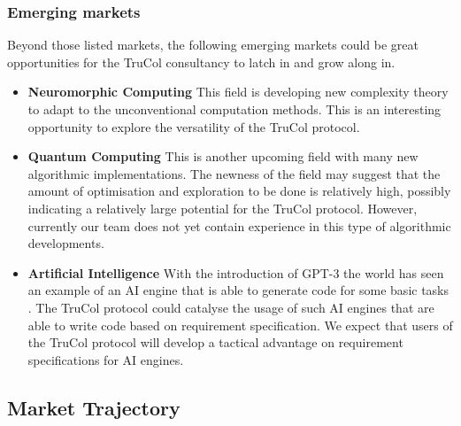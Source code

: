 \subsubsection{Emerging markets}\label{subsubsec:emerging_markets}
Beyond those listed markets, the following emerging markets could be great opportunities for the TruCol consultancy to latch in and grow along in.
\begin{itemize}
	\item \textbf{Neuromorphic Computing} This field is developing new complexity theory to adapt to the unconventional computation methods. This is an interesting opportunity to explore the versatility of the TruCol protocol.
	\item \textbf{Quantum Computing} This is another upcoming field with many new algorithmic implementations. The newness of the field may suggest that the amount of optimisation and exploration to be done is relatively high, possibly indicating a relatively large potential for the TruCol protocol. However, currently our team does not yet contain experience in this type of algorithmic developments.
	\item \textbf{Artificial Intelligence} With the introduction of GPT-3 the world has seen an example of an AI engine that is able to generate code for some basic tasks \cite{todo}. The TruCol protocol could catalyse the usage of such AI engines that are able to write code based on requirement specification. We expect that users of the TruCol protocol will develop a tactical advantage on requirement specifications for AI engines.
\end{itemize}


\subsection{Market Trajectory}\label{subsec:model_description_market_trajectory}